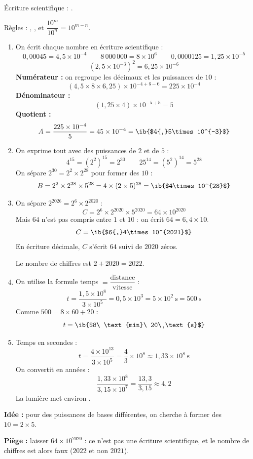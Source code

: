 \begin{prop}
Écriture scientifique : .

Règles : , ,  et $\dfrac{10^{m}}{10^{n}}=10^{m-n}$.
\end{prop}
\begin{enumerate}
  \item On écrit chaque nombre en écriture scientifique :
  \[0{,}00045=4{,}5\times10^{-4}\qquad8\,000\,000=8\times10^{6}\qquad0{,}0000125=1{,}25\times10^{-5}\]
  \[(2{,}5\times10^{-3})^2=6{,}25\times10^{-6}\]
  \textbf{Numérateur :} on regroupe les décimaux et les puissances de $10$ :
  \[(4{,}5\times8\times6{,}25)\times10^{-4+6-6}=225\times10^{-4}\]
  \textbf{Dénominateur :}
  \[(1{,}25\times4)\times10^{-5+5}=5\]
  \textbf{Quotient :}
  \[A=\dfrac{225\times10^{-4}}{5}=45\times10^{-4}=\ib{$4{,}5\times10^{-3}$}\]

  \item On exprime tout avec des puissances de $2$ et de $5$ :
  \[4^{15}=(2^2)^{15}=2^{30}\qquad25^{14}=(5^2)^{14}=5^{28}\]
  On sépare $2^{30}=2^{2}\times2^{28}$ pour former des $10$ :
  \[B=2^{2}\times2^{28}\times5^{28}=4\times(2\times5)^{28}=\ib{$4\times10^{28}$}\]

  \item On sépare $2^{2026}=2^{6}\times2^{2020}$ :
  \[C=2^{6}\times2^{2020}\times5^{2020}=64\times10^{2020}\]
  Mais $64$ n'est pas compris entre $1$ et $10$ : on écrit $64=6{,}4\times10$.
  \[C=\ib{$6{,}4\times10^{2021}$}\]
  En écriture décimale, $C$ s'écrit $64$ suivi de $2020$ zéros.

  Le nombre de chiffres est $2+2020=\boxed{2022}$.

  \item On utilise la formule \og temps $=\dfrac{\text{distance}}{\text{vitesse}}$ \fg{} :
  \[t=\dfrac{1{,}5\times10^{8}}{3\times10^{5}}=0{,}5\times10^{3}=5\times10^{2}\ \text{s}=500\ \text{s}\]
  Comme $500=8\times60+20$ :
  \[t=\ib{$8\ \text{min}\ 20\ \text{s}$}\]

  \item Temps en secondes :
  \[t=\dfrac{4\times10^{13}}{3\times10^{5}}=\dfrac43\times10^{8}\approx1{,}33\times10^{8}\ \text{s}\]
  On convertit en années :
  \[\dfrac{1{,}33\times10^{8}}{3{,}15\times10^{7}}=\dfrac{13{,}3}{3{,}15}\approx4{,}2\]
  La lumière met environ .
\end{enumerate}
\textbf{Idée :} pour des puissances de bases différentes, on cherche à former des $10=2\times5$.

\textbf{Piège :} laisser $64\times10^{2020}$ : ce n'est pas une écriture scientifique, et le nombre de chiffres est alors faux ($2022$ et non $2021$).
